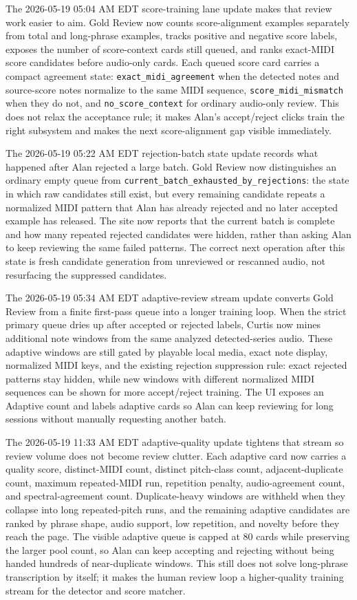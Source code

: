 \documentclass[12pt,letterpaper]{article}
\begin{document}
The 2026-05-19 05:04 AM EDT score-training lane update makes that review work easier to aim. Gold Review now counts score-alignment examples separately from total and long-phrase examples, tracks positive and negative score labels, exposes the number of score-context cards still queued, and ranks exact-MIDI score candidates before audio-only cards. Each queued score card carries a compact agreement state: \texttt{exact\_midi\_agreement} when the detected notes and source-score notes normalize to the same MIDI sequence, \texttt{score\_midi\_mismatch} when they do not, and \texttt{no\_score\_context} for ordinary audio-only review. This does not relax the acceptance rule; it makes Alan's accept/reject clicks train the right subsystem and makes the next score-alignment gap visible immediately.

The 2026-05-19 05:22 AM EDT rejection-batch state update records what happened after Alan rejected a large batch. Gold Review now distinguishes an ordinary empty queue from \texttt{current\_batch\_exhausted\_by\_rejections}: the state in which raw candidates still exist, but every remaining candidate repeats a normalized MIDI pattern that Alan has already rejected and no later accepted example has released. The site now reports that the current batch is complete and how many repeated rejected candidates were hidden, rather than asking Alan to keep reviewing the same failed patterns. The correct next operation after this state is fresh candidate generation from unreviewed or rescanned audio, not resurfacing the suppressed candidates.

The 2026-05-19 05:34 AM EDT adaptive-review stream update converts Gold Review from a finite first-pass queue into a longer training loop. When the strict primary queue dries up after accepted or rejected labels, Curtis now mines additional note windows from the same analyzed detected-series audio. These adaptive windows are still gated by playable local media, exact note display, normalized MIDI keys, and the existing rejection suppression rule: exact rejected patterns stay hidden, while new windows with different normalized MIDI sequences can be shown for more accept/reject training. The UI exposes an Adaptive count and labels adaptive cards so Alan can keep reviewing for long sessions without manually requesting another batch.

The 2026-05-19 11:33 AM EDT adaptive-quality update tightens that stream so review volume does not become review clutter. Each adaptive card now carries a quality score, distinct-MIDI count, distinct pitch-class count, adjacent-duplicate count, maximum repeated-MIDI run, repetition penalty, audio-agreement count, and spectral-agreement count. Duplicate-heavy windows are withheld when they collapse into long repeated-pitch runs, and the remaining adaptive candidates are ranked by phrase shape, audio support, low repetition, and novelty before they reach the page. The visible adaptive queue is capped at 80 cards while preserving the larger pool count, so Alan can keep accepting and rejecting without being handed hundreds of near-duplicate windows. This still does not solve long-phrase transcription by itself; it makes the human review loop a higher-quality training stream for the detector and score matcher.
\end{document}
